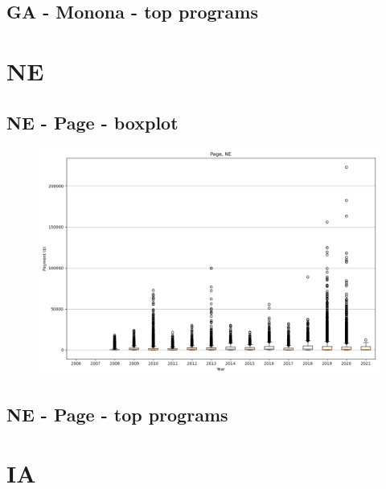 \subsection*{GA - Monona - top programs}

\newpage
\section*{NE}
\subsection*{NE - Page - boxplot}
\begin{figure}[h]
\centering
\includegraphics[width=7in]{../output/boxplots/counties/Page-NE_boxplot.png}
\end{figure}


\subsection*{NE - Page - top programs}

\newpage
\section*{IA}
